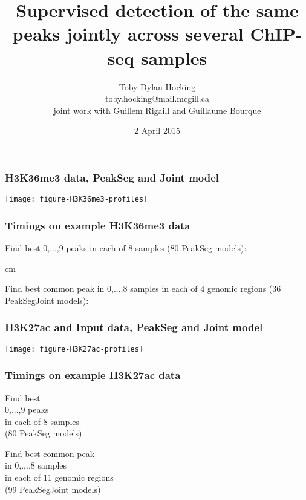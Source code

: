 \documentclass{beamer}
\begin{document}
\title{Supervised detection of the same peaks jointly across 
  several ChIP-seq samples}

\author{
  Toby Dylan Hocking\\
  toby.hocking@mail.mcgill.ca\\
  joint work with Guillem Rigaill and Guillaume Bourque}

\date{2 April 2015}

\maketitle



\begin{frame}
  \frametitle{H3K36me3 data, PeakSeg and Joint model}

  \texttt{[image: figure-H3K36me3-profiles]}
\end{frame}

\begin{frame}
  \frametitle{Timings on example H3K36me3 data}

  \small

  Find best 0,...,9 peaks in each of 8 samples (80 PeakSeg
  models):

  

   cm

  Find best common peak in 0,...,8 samples in each of 4 genomic
  regions (36 PeakSegJoint models):

  

\end{frame}

\begin{frame}
  \frametitle{H3K27ac and Input data, PeakSeg and Joint model}

  \texttt{[image: figure-H3K27ac-profiles]}
\end{frame}

\begin{frame}
  \frametitle{Timings on example H3K27ac data}

  \scriptsize

  \parbox{2in}{
    Find best \\
  0,...,9 peaks\\
  in each of 8 samples\\
  (80 PeakSeg models)

  
  }
  \parbox{2in}{
  Find best common peak\\
  in 0,...,8 samples\\
  in each of 11 genomic regions\\
  (99 PeakSegJoint models)

  
  }

\end{frame}
\end{document}
